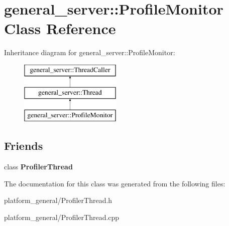 \hypertarget{classgeneral__server_1_1ProfileMonitor}{\section{general\-\_\-server\-:\-:\-Profile\-Monitor \-Class \-Reference}
\label{classgeneral__server_1_1ProfileMonitor}
}
\-Inheritance diagram for general\-\_\-server\-:\-:\-Profile\-Monitor\-:\begin{figure}[H]
\begin{center}
\leavevmode
\includegraphics[height=3.000000cm]{classgeneral__server_1_1ProfileMonitor}
\end{center}
\end{figure}
\subsection*{\-Friends}
\begin{DoxyCompactItemize}
\item 
\hypertarget{classgeneral__server_1_1ProfileMonitor_a49628308e1880843500661027d4b3a33}{class {\bfseries \-Profiler\-Thread}}\label{classgeneral__server_1_1ProfileMonitor_a49628308e1880843500661027d4b3a33}

\end{DoxyCompactItemize}


\-The documentation for this class was generated from the following files\-:\begin{DoxyCompactItemize}
\item 
platform\-\_\-general/\-Profiler\-Thread.\-h\item 
platform\-\_\-general/\-Profiler\-Thread.\-cpp\end{DoxyCompactItemize}
